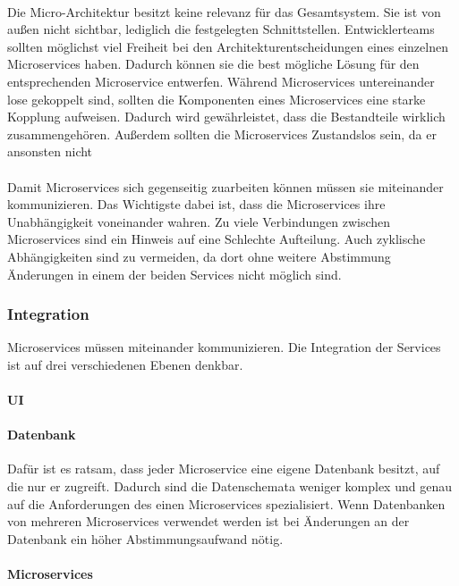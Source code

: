 \\
Die Micro-Architektur besitzt keine relevanz für das Gesamtsystem. Sie ist von außen nicht sichtbar, lediglich die festgelegten Schnittstellen. Entwicklerteams sollten möglichst viel Freiheit bei den Architekturentscheidungen eines einzelnen Microservices haben. Dadurch können sie die best mögliche Lösung für den entsprechenden Microservice entwerfen. Während Microservices untereinander lose gekoppelt sind, sollten die Komponenten eines Microservices eine starke Kopplung aufweisen. Dadurch wird gewährleistet, dass die Bestandteile wirklich zusammengehören. Außerdem sollten die Microservices Zustandslos sein, da er ansonsten nicht  \\
\\
Damit Microservices sich gegenseitig zuarbeiten können müssen sie miteinander kommunizieren. Das Wichtigste dabei ist, dass die Microservices ihre Unabhängigkeit voneinander wahren. Zu viele Verbindungen zwischen Microservices sind ein Hinweis auf eine Schlechte Aufteilung. Auch zyklische Abhängigkeiten sind zu vermeiden, da dort ohne weitere Abstimmung Änderungen in einem der beiden Services nicht möglich sind. \\

\subsubsection{Integration}

Microservices müssen miteinander kommunizieren. Die Integration der Services ist auf drei verschiedenen Ebenen denkbar.

\paragraph{UI}

\paragraph{Datenbank}

Dafür ist es ratsam, dass jeder Microservice eine eigene Datenbank besitzt, auf die nur er zugreift. Dadurch sind die Datenschemata weniger komplex und genau auf die Anforderungen des einen Microservices spezialisiert.  Wenn Datenbanken von mehreren Microservices verwendet werden ist bei Änderungen an der Datenbank ein höher Abstimmungsaufwand nötig.

\paragraph{Microservices}


